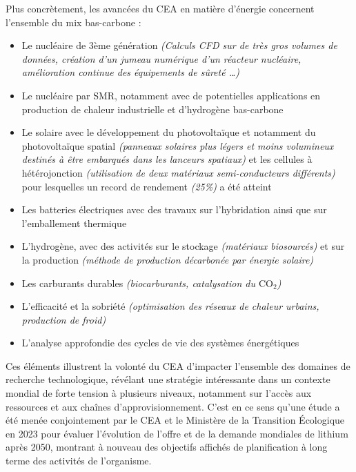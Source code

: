         Plus concrètement, les avancées du \gls{CEA} en matière d'énergie concernent l'ensemble du mix bas-carbone :
        \begin{itemize}
            \item Le nucléaire de 3ème génération \textit{(Calculs CFD sur de très gros volumes de données, création d'un jumeau numérique d'un réacteur nucléaire, amélioration continue des équipements de sûreté \ldots)}
            \item Le nucléaire par \gls{SMR}, notamment avec de potentielles applications en production de chaleur industrielle et d'hydrogène bas-carbone
            \item Le solaire avec le développement du photovoltaïque et notamment du photovoltaïque spatial \textit{(panneaux solaires plus légers et moins volumineux destinés à être embarqués dans les lanceurs spatiaux)} et les cellules à hétérojonction \textit{(utilisation de deux matériaux semi-conducteurs différents)} pour lesquelles un record de rendement \textit{(25\%)} a été atteint
            \item Les batteries électriques avec des travaux sur l'hybridation ainsi que sur l'emballement thermique
            \item L'hydrogène, avec des activités sur le stockage \textit{(matériaux biosourcés)} et sur la production \textit{(méthode de production décarbonée par énergie solaire)}
            \item Les carburants durables \textit{(biocarburants, catalysation du $\textrm {CO}_2$)}
            \item L'efficacité et la sobriété \textit{(optimisation des réseaux de chaleur urbains, production de froid)}
            \item L'analyse approfondie des cycles de vie des systèmes énergétiques
        \end{itemize}

    \begin{bluebox}
        Ces éléments illustrent la volonté du \gls{CEA} d'impacter l'ensemble des domaines de recherche technologique, révélant une stratégie intéressante dans un contexte mondial de forte tension à plusieurs niveaux, notamment sur l'accès aux ressources et aux chaînes d'approvisionnement.
        C'est en ce sens qu'une étude a été menée conjointement par le \gls{CEA} et le Ministère de la Transition Écologique en 2023 pour évaluer l'évolution de l'offre et de la demande mondiales de lithium après 2050, montrant à nouveau des objectifs affichés de planification à long terme des activités de l'organisme.
    \end{bluebox}

